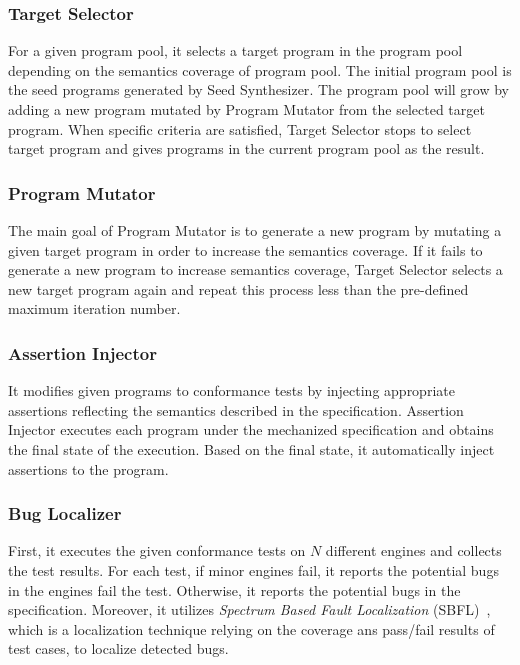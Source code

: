 \subsubsection{Target Selector}
For a given program pool, it selects a target program in the program pool
depending on the semantics coverage of program pool.  The initial program pool
is the seed programs generated by \textsf{Seed Synthesizer}. The program pool
will grow by adding a new program mutated by \textsf{Program Mutator} from
the selected target program.  When specific criteria are satisfied,
\textsf{Target Selector} stops to select target program and gives programs in
the current program pool as the result.
\newline

\subsubsection{Program Mutator}
The main goal of \textsf{Program Mutator} is to generate a new program by
mutating a given target program in order to increase the semantics coverage.
If it fails to generate a new program to increase semantics coverage,
\textsf{Target Selector} selects a new target program again and repeat this
process less than the pre-defined maximum iteration number.
\newline

\subsubsection{Assertion Injector}
It modifies given programs to conformance tests by injecting appropriate
assertions reflecting the semantics described in the specification.
\textsf{Assertion Injector} executes each program under the mechanized
specification and obtains the final state of the execution.  Based on the final
state, it automatically inject assertions to the program.
\newline

\subsubsection{Bug Localizer}
First, it executes the given conformance tests on $N$ different engines and
collects the test results.  For each test, if minor engines fail, it reports the
potential bugs in the engines fail the test.  Otherwise, it reports the
potential bugs in the specification.  Moreover, it utilizes \textit{Spectrum
Based Fault Localization} (SBFL)~\cite{sbfl-survey}, which is a localization
technique relying on the coverage ans pass/fail results of test cases, to
localize detected bugs.
